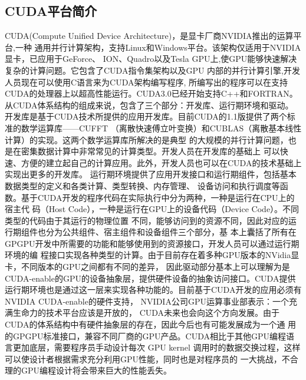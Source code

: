 \subsection{CUDA平台简介}
CUDA(Compute Unified Device Architecture)，是显卡厂商NVIDIA推出的运算平台,一种
通用并行计算架构，支持Linux和Windows平台。该架构仅适用于NVIDIA显卡，已应用于GeForce、
ION、Quadro以及Tesla GPU上,使GPU能够快速解决
复杂的计算问题。它包含了CUDA指令集架构以及GPU
内部的并行计算引擎,开发人员现在可以使用C语言来为CUDA架构编写程序,
所编写出的程序可以在支持CUDA的处理器上以超高性能运行。CUDA3.0已经开始支持C++和FORTRAN。
从CUDA体系结构的组成来说，包含了三个部分：开发库、运行期环境和驱动。
开发库是基于CUDA技术所提供的应用开发库。目前CUDA的1.1版提供了两个标准的数学运算库——CUFFT
（离散快速傅立叶变换）和CUBLAS（离散基本线性计算）的实现。这两个数学运算库所解决的是典型
的大规模的并行计算问题，也是在密集数据计算中非常常见的计算类型。开发人员在开发库的基础上
可以快速、方便的建立起自己的计算应用。此外，开发人员也可以在CUDA的技术基础上实现出更多的开发库。
运行期环境提供了应用开发接口和运行期组件，包括基本数据类型的定义和各类计算、类型转换、内存管理、
设备访问和执行调度等函数。基于CUDA开发的程序代码在实际执行中分为两种，一种是运行在CPU上的宿主代
码（Host Code），一种是运行在GPU上的设备代码（Device Code）。不同类型的代码由于其运行的物理位置
不同，能够访问到的资源不同，因此对应的运行期组件也分为公共组件、宿主组件和设备组件三个部分，基
本上囊括了所有在GPGPU开发中所需要的功能和能够使用到的资源接口，开发人员可以通过运行期环境的编
程接口实现各种类型的计算。由于目前存在着多种GPU版本的NVidia显卡，不同版本的GPU之间都有不同的差异，
因此驱动部分基本上可以理解为是CUDA-enable的GPU的设备抽象层，提供硬件设备的抽象访问接口。CUDA提供
运行期环境也是通过这一层来实现各种功能的。目前基于CUDA开发的应用必须有NVIDIA CUDA-enable的硬件支持，
NVIDIA公司GPU运算事业部表示：一个充满生命力的技术平台应该是开放的，
CUDA未来也会向这个方向发展。由于CUDA的体系结构中有硬件抽象层的存在，因此今后也有可能发展成为一个通
用的GPGPU标准接口，兼容不同厂商的GPU产品。CUDA相比于其他GPU编程语言更加底层，需要程序员手动设计每次
GPU kernel 调用时的数据交换过程，这样可以使设计者根据需求充分利用GPU性能，同时也是对程序员的
一大挑战，不合理的GPU编程设计将会带来巨大的性能丢失。

